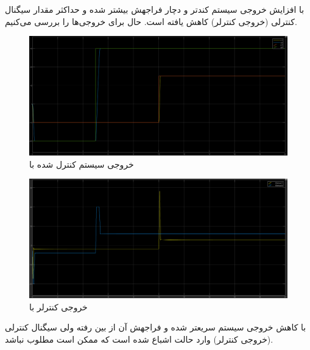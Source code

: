 \documentclass[14pt, a4paper]{extarticle}
\begin{document}
با افزایش 
خروجی سیستم کندتر و دچار فراجهش بیشتر شده و حداکثر مقدار سیگنال کنترلی (خروجی کنترلر) کاهش یافته است.
\newpage
حال برای 
خروجی‌ها را بررسی می‌کنیم.\\
\begin{figure}[h!]
	\centering
	\includegraphics[scale = 0.3]{Q2_sim_result_st001.png}
	\caption{خروجی سیستم کنترل شده با
		}
\end{figure}
\begin{figure}[h!]
	\centering
	\includegraphics[scale = 0.3]{Q2_sim_control_st001.png}
	\caption{خروجی کنترلر با
		}
\end{figure}

با کاهش 
خروجی سیستم سریعتر شده و فراجهش آن از بین رفته ولی سیگنال کنترلی (خروجی کنترلر) وارد حالت اشباع شده است که ممکن است مطلوب نباشد.

\newpage
\end{document}
